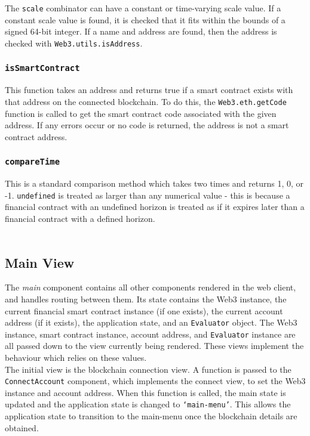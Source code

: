 The \texttt{scale} combinator can have a constant or time-varying scale value. If a constant scale value is found, it is checked that it fits within the bounds of a signed 64-bit integer. If a name and address are found, then the address is checked with \texttt{Web3.utils.isAddress}.

\subsubsection{\texttt{isSmartContract}}

This function takes an address and returns true if a smart contract exists with that address on the connected blockchain. To do this, the \texttt{Web3.eth.getCode} function is called to get the smart contract code associated with the given address. If any errors occur or no code is returned, the address is not a smart contract address.

\subsubsection{\texttt{compareTime}}

This is a standard comparison method which takes two times and returns 1, 0, or -1. \texttt{undefined} is treated as larger than any numerical value - this is because a financial contract with an undefined horizon is treated as if it expires later than a financial contract with a defined horizon. \\ \\


\subsection{Main View}

The \textit{main} component contains all other components rendered in the web client, and handles routing between them. Its state contains the Web3 instance, the current financial smart contract instance (if one exists), the current account address (if it exists), the application state, and an \texttt{Evaluator} object. The Web3 instance, smart contract instance, account address, and \texttt{Evaluator} instance are all passed down to the view currently being rendered. These views implement the behaviour which relies on these values. \\

The initial view is the blockchain connection view. A function is passed to the \texttt{ConnectAccount} component, which implements the connect view, to set the Web3 instance and account address. When this function is called, the main state is updated and the application state is changed to \texttt{`main-menu'}. This allows the application state to transition to the main-menu once the blockchain details are obtained. \\

